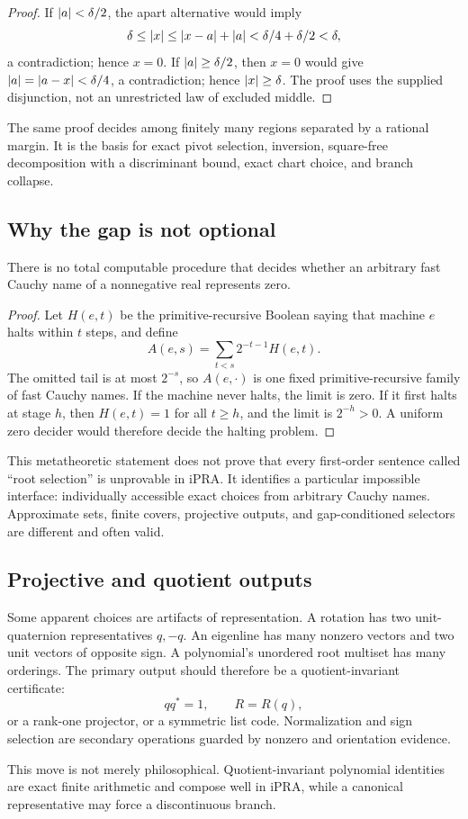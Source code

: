 \begin{proof}
If \(\lvert a\rvert<\delta/2\), the apart alternative would imply
\[
 \delta\le\lvert x\rvert\le\lvert x-a\rvert+\lvert a\rvert
 <\delta/4+\delta/2<\delta,
\]
a contradiction; hence \(x=0\).  If \(\lvert a\rvert\ge\delta/2\), then \(x=0\)
would give \(\lvert a\rvert=\lvert a-x\rvert<\delta/4\), a contradiction; hence
\(\lvert x\rvert\ge\delta\).  The proof uses the supplied disjunction, not an
unrestricted law of excluded middle.
\end{proof}

The same proof decides among finitely many regions separated by a rational
margin.  It is the basis for exact pivot selection, inversion, square-free
decomposition with a discriminant bound, exact chart choice, and branch
collapse.

\subsection{Why the gap is not optional}

\begin{obstruction}
There is no total computable procedure that decides whether an arbitrary fast
Cauchy name of a nonnegative real represents zero.
\end{obstruction}

\begin{proof}
Let \(H(e,t)\) be the primitive-recursive Boolean saying that machine \(e\)
halts within \(t\) steps, and define
\[
  A(e,s)=\sum_{t<s}2^{-t-1}H(e,t).
\]
The omitted tail is at most \(2^{-s}\), so \(A(e,\cdot)\) is one fixed
primitive-recursive family of fast Cauchy names.  If the machine never halts,
the limit is zero.  If it first halts at stage \(h\), then \(H(e,t)=1\) for
all \(t\ge h\), and the limit is \(2^{-h}>0\).  A uniform zero decider would
therefore decide the halting problem.
\end{proof}

This metatheoretic statement does not prove that every first-order sentence
called ``root selection'' is unprovable in iPRA.  It identifies a particular
impossible interface: individually accessible exact choices from arbitrary
Cauchy names.  Approximate sets, finite covers, projective outputs, and
gap-conditioned selectors are different and often valid.

\subsection{Projective and quotient outputs}

Some apparent choices are artifacts of representation.  A rotation has two
unit-quaternion representatives \(q,-q\).  An eigenline has many nonzero
vectors and two unit vectors of opposite sign.  A polynomial's unordered
root multiset has many orderings.  The primary output should therefore be a
quotient-invariant certificate:
\[
  qq^\ast=1,\qquad R=R(q),
\]
or a rank-one projector, or a symmetric list code.  Normalization and sign
selection are secondary operations guarded by nonzero and orientation
evidence.

This move is not merely philosophical.  Quotient-invariant polynomial
identities are exact finite arithmetic and compose well in iPRA, while a
canonical representative may force a discontinuous branch.
